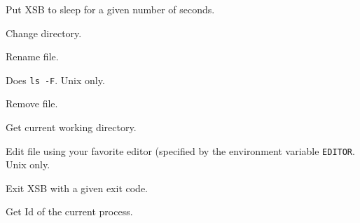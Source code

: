 \begin{description}

Put XSB to sleep for a given number of seconds.

Change directory.

Rename file.

Does {\tt ls -F}. Unix only.

Remove file.

Get current working directory.

Edit file using your favorite editor (specified by the environment variable
{\tt EDITOR}. Unix only.

Exit XSB with a given exit code.

Get Id of the current process.

\end{description}

